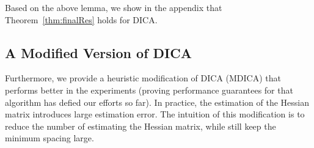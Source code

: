 \documentclass[twoside,11pt]{article}
\newcommand{\Ephione}{\mathcal{E}_{\phi_1}}
\newcommand{\E}{\mathbb{E}}
\begin{document}
Based on the above lemma, we show in the appendix that Theorem~\ref{thm:finalRes} holds for DICA.


\subsection{A Modified Version of DICA}
\label{subsec:modifiedDICA}
Furthermore, we provide a heuristic modification of DICA (MDICA) that performs better in the experiments (proving performance guarantees for that algorithm has defied our efforts so far). 
In practice, the estimation of the Hessian matrix introduces large estimation error.
The intuition of this modification is to reduce the number of estimating the Hessian matrix, while still keep the minimum spacing large.

\end{document}
